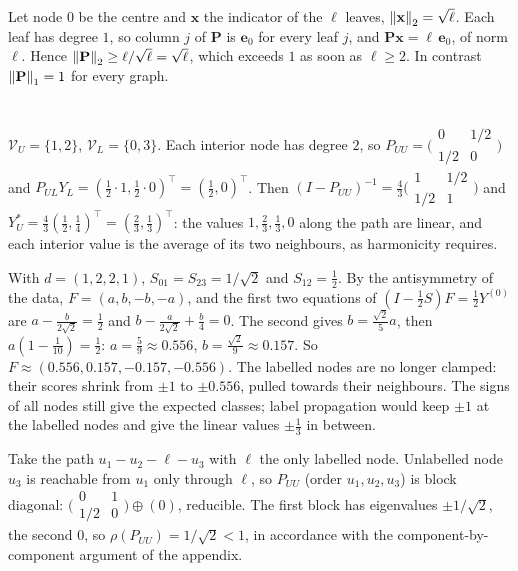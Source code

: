 Let node $0$ be the centre and $\mathbf x$ the indicator of the $\ell$ leaves, $\left\|\mathbf x\right\|_2 = \sqrt\ell$. Each leaf has degree $1$, so column $j$ of $\mathbf P$ is $\mathbf e_0$ for every leaf $j$, and $\mathbf P\mathbf x = \ell\,\mathbf e_0$, of norm $\ell$. Hence $\left\|\mathbf P\right\|_2 \ge \ell/\sqrt\ell = \sqrt\ell$, which exceeds $1$ as soon as $\ell \ge 2$. In contrast $\left\|\mathbf P\right\|_1 = 1$ for every graph.

\section{}

$\mathcal V_U = \{1, 2\}$, $\mathcal V_L = \{0, 3\}$. Each interior node has degree $2$, so $P_{UU} = \bigl(\begin{smallmatrix}0&1/2\\1/2&0\end{smallmatrix}\bigr)$ and $P_{UL}Y_L = (\frac12\cdot1, \frac12\cdot0)^\top = (\frac12, 0)^\top$. Then $(I - P_{UU})^{-1} = \frac43\bigl(\begin{smallmatrix}1&1/2\\1/2&1\end{smallmatrix}\bigr)$ and $Y_U^* = \frac43(\frac12, \frac14)^\top = (\frac23, \frac13)^\top$: the values $1, \frac23, \frac13, 0$ along the path are linear, and each interior value is the average of its two neighbours, as harmonicity requires.

With $d = (1,2,2,1)$, $S_{01} = S_{23} = 1/\sqrt2$ and $S_{12} = \frac12$. By the antisymmetry of the data, $F = (a, b, -b, -a)$, and the first two equations of $(I - \frac12S)F = \frac12Y^{(0)}$ are $a - \frac{b}{2\sqrt2} = \frac12$ and $b - \frac{a}{2\sqrt2} + \frac b4 = 0$. The second gives $b = \frac{\sqrt2}{5}a$, then $a(1 - \frac1{10}) = \frac12$: $a = \frac59 \approx 0.556$, $b = \frac{\sqrt2}{9} \approx 0.157$. So $F \approx (0.556, 0.157, -0.157, -0.556)$. The labelled nodes are no longer clamped: their scores shrink from $\pm1$ to $\pm0.556$, pulled towards their neighbours. The signs of all nodes still give the expected classes; label propagation would keep $\pm1$ at the labelled nodes and give the linear values $\pm\frac13$ in between.

Take the path $u_1 - u_2 - \ell - u_3$ with $\ell$ the only labelled node. Unlabelled node $u_3$ is reachable from $u_1$ only through $\ell$, so $P_{UU}$ (order $u_1, u_2, u_3$) is block diagonal: $\bigl(\begin{smallmatrix}0&1\\1/2&0\end{smallmatrix}\bigr) \oplus (0)$, reducible. The first block has eigenvalues $\pm1/\sqrt2$, the second $0$, so $\rho(P_{UU}) = 1/\sqrt2 < 1$, in accordance with the component-by-component argument of the appendix.

